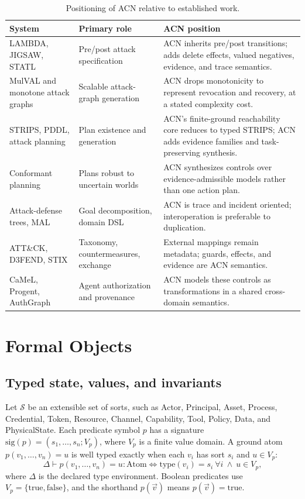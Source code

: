 \documentclass[11pt,letterpaper]{article}
\theoremstyle{definition}
\begin{document}
\begin{table}[t]
\centering\small
\caption{Positioning of ACN relative to established work.}\label{tab:position}
\begin{tabularx}{\textwidth}{@{}l l X@{}}
\toprule
System & Primary role & ACN position \\
\midrule
LAMBDA, JIGSAW, STATL & Pre/post attack specification & ACN inherits pre/post transitions; adds delete effects, valued negatives, evidence, and trace semantics. \\
MulVAL and monotone attack graphs & Scalable attack-graph generation & ACN drops monotonicity to represent revocation and recovery, at a stated complexity cost. \\
STRIPS, PDDL, attack planning & Plan existence and generation & ACN's finite-ground reachability core reduces to typed STRIPS; ACN adds evidence families and task-preserving synthesis. \\
Conformant planning & Plans robust to uncertain worlds & ACN synthesizes controls over evidence-admissible models rather than one action plan. \\
Attack-defense trees, MAL & Goal decomposition, domain DSL & ACN is trace and incident oriented; interoperation is preferable to duplication. \\
ATT\&CK, D3FEND, STIX & Taxonomy, countermeasures, exchange & External mappings remain metadata; guards, effects, and evidence are ACN semantics. \\
CaMeL, Progent, AuthGraph & Agent authorization and provenance & ACN models these controls as transformations in a shared cross-domain semantics. \\
\bottomrule
\end{tabularx}
\end{table}

\section{Formal Objects}\label{sec:formal}

\subsection{Typed state, values, and invariants}

Let $\mathcal{S}$ be an extensible set of sorts, such as Actor, Principal, Asset, Process, Credential, Token, Resource, Channel, Capability, Tool, Policy, Data, and PhysicalState. Each predicate symbol $p$ has a signature $\mathrm{sig}(p)=(s_1,\dots,s_n;V_p)$, where $V_p$ is a finite value domain. A ground atom $p(v_1,\dots,v_n)=u$ is well typed exactly when each $v_i$ has sort $s_i$ and $u\in V_p$:
\begin{equation}
\Delta\vdash p(v_1,\dots,v_n)=u : \mathrm{Atom}\iff \mathrm{type}(v_i)=s_i\ \forall i \ \wedge\ u\in V_p,
\end{equation}
where $\Delta$ is the declared type environment. Boolean predicates use $V_p=\{\mathrm{true},\mathrm{false}\}$, and the shorthand $p(\vec v)$ means $p(\vec v)=\mathrm{true}$.
\end{document}
